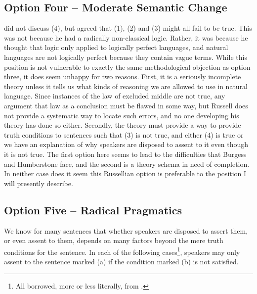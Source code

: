 \subsection*{Option Four -- Moderate Semantic Change}

\citet{Russell1923} did not discuss (4), but agreed that (1), (2) and (3) might all fail to be true. This was not because he had a radically non-classical logic. Rather, it was because he thought that logic only applied to logically perfect languages, and natural languages are not logically perfect because they contain vague terms. While this position is not vulnerable to exactly the same methodological objection as option three, it does seem unhappy for two reasons. First, it is a seriously incomplete theory unless it tells us what kinds of reasoning we are allowed to use in natural language. Since instances of the law of excluded middle are not true, any argument that law as a conclusion must be flawed in some way, but Russell does not provide a systematic way to locate such errors, and no one developing his theory has done so either. Secondly, the theory must provide a way to provide truth conditions to sentences such that (3) is not true, and either (4) is true or we have an explanation of why speakers are disposed to assent to it even though it is not true. The first option here seems to lead to the difficulties that Burgess and Humberstone face, and the second is a theory schema in need of completion. In neither case does it seem this Russellian option is preferable to the position I will presently describe.

\subsection*{Option Five -- Radical Pragmatics}

We know for many sentences that whether speakers are disposed to assert them, or even assent to them, depends on many factors beyond the mere truth conditions for the sentence. In each of the following cases\footnote{All borrowed, more or less literally, from \citet{Grice1989}.}, speakers may only assent to the sentence marked (a) if the condition marked (b) is not satisfied.

